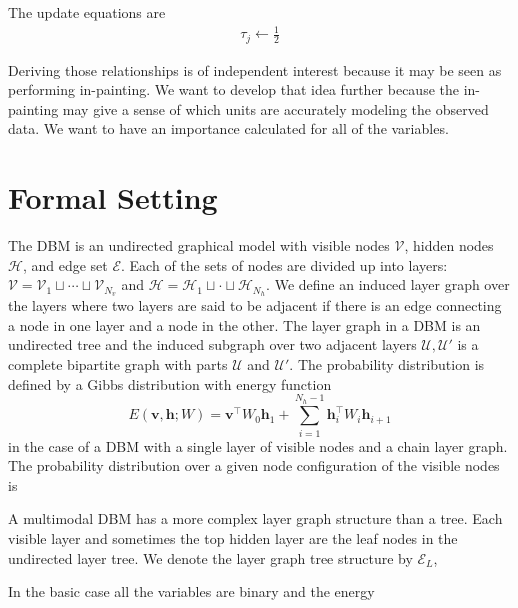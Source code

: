 \documentclass{article} %
\begin{document}
The update equations are
\begin{align}
\tau_j \leftarrow \frac{1}{2}
\end{align}



Deriving those relationships is of independent interest because it may be seen as performing in-painting.  We want to develop that idea
further because the in-painting may give a sense of which units are accurately modeling the observed data. We want to have an importance
calculated for all of the variables.

\section{Formal Setting}

The DBM is an undirected graphical model with visible nodes $\mathcal{V}$, hidden nodes $\mathcal{H}$, and edge set
$\mathcal{E}$.  Each of the sets of nodes are divided up into layers: $\mathcal{V}=\mathcal{V}_1\sqcup\cdots\sqcup\mathcal{V}_{N_v}$
and $\mathcal{H}=\mathcal{H}_1\sqcup\cdot\sqcup\mathcal{H}_{N_h}$. We define an induced layer graph over the layers where two
layers are said to be adjacent if there is an edge connecting a node in one layer and a node in the other. The layer graph 
in a DBM is an undirected tree and the induced subgraph over two adjacent layers $\mathcal{U},\mathcal{U}'$ is a complete
bipartite graph with parts $\mathcal{U}$ and $\mathcal{U}'$. The probability distribution is defined by a Gibbs distribution
with energy function
\begin{equation}
E(\mathbf{v},\mathbf{h}; W) = \mathbf{v}^\top W_0 \mathbf{h}_1 +\sum_{i=1}^{N_h-1} \mathbf{h}_i^\top W_i \mathbf{h}_{i+1}
\end{equation}  
in the case of a DBM with a single layer of visible nodes and a chain layer graph. The probability distribution over a given
node configuration of the visible nodes is

A multimodal DBM has a more complex layer graph structure than a tree.  Each visible layer and sometimes the top hidden layer
are the leaf nodes in the undirected layer tree.  We denote the layer graph tree structure by $\mathcal{E}_L$, 

In the basic case all the variables are binary and the
energy 
\end{document}
